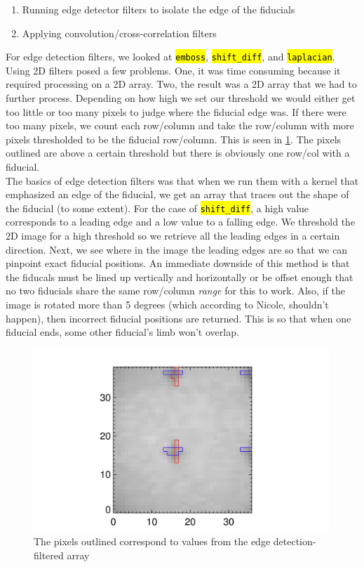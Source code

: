 \documentclass[10pt]{scrartcl}
\begin{document}
\begin{enumerate}
    \item Running edge detector filters to isolate the edge of the fiducials
    \item Applying convolution/cross-correlation filters 
\end{enumerate}

For edge detection filters, we looked at \hl{\texttt{emboss}}, \hl{\texttt{shift\_diff}}, and \hl{\texttt{laplacian}}. Using 2D filters posed a few problems. One, it was time consuming because it required processing on a 2D array. Two, the result was a 2D array that we had to further process. Depending on how high we set our threshold we would either get too little or too many pixels to judge where the fiducial edge was. If there were too many pixels, we count each row/column and take the row/column with more pixels thresholded to be the fiducial row/column. This is seen in \cref{edge_det}. The pixels outlined are above a certain threshold  but there is obviously one row/col with a fiducial.\\

The basics of edge detection filters was that when we run them with a kernel that emphasized an edge of the fiducial, we get an array that traces out the shape of the fiducial (to some extent). For the case of \hl{\texttt{shift\_diff}}, a high value corresponds to a leading edge and a low value to a falling edge. We threshold the 2D image for a high threshold so we retrieve all the leading edges in a certain direction. Next, we see where in the image the leading edges are so that we can pinpoint exact fiducial positions. An immediate downside of this method is that the fiducals must be lined up vertically and horizontally or be offset enough that no two fiducials share the same row/column \emph{range} for this to work. Also, if the image is rotated more than 5 degrees (which according to Nicole, shouldn't happen), then incorrect fiducial positions are returned. This is so that when one fiducial ends, some other fiducial's limb won't overlap.

\begin{figure}[!ht]
   \includegraphics[width=.75\textwidth]{../plots_tables_images/threshtesh_3.png}%
   \caption{The pixels outlined correspond to values from the edge detection-filtered array}\label{edge_det}
\end{figure}
\end{document}
